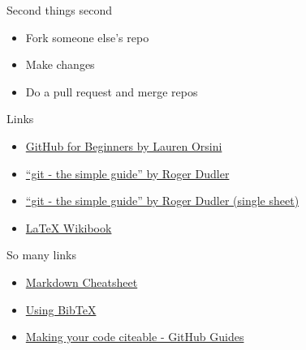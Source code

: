 \begin{frame}{Second things second}

\begin{itemize}
\itemsep1pt\parskip0pt
\item
  Fork someone else's repo
\item
  Make changes
\item
  Do a pull request and merge repos
\end{itemize}

\end{frame}

\begin{frame}{Links}

\begin{itemize}
\itemsep1pt\parskip0pt
\item
  \href{http://readwrite.com/2013/09/30/understanding-github-a-journey-for-beginners-part-1\#awesm=~oElSkDwiv4MYYT}{GitHub
  for Beginners by Lauren Orsini}
\item
  \href{http://rogerdudler.github.io/git-guide/}{``git - the simple
  guide'' by Roger Dudler}
\item
  \href{http://rogerdudler.github.io/git-guide/files/git_cheat_sheet.pdf}{``git
  - the simple guide'' by Roger Dudler (single sheet)}
\item
  \href{http://en.wikibooks.org/wiki/LaTeX}{LaTeX Wikibook}
\end{itemize}

\end{frame}

\begin{frame}{So many links}

\begin{itemize}
\itemsep1pt\parskip0pt
\item
  \href{https://github.com/adam-p/markdown-here/wiki/Markdown-Cheatsheet}{Markdown
  Cheatsheet}
\item
  \href{http://www.bibtex.org/Using/}{Using BibTeX}
\item
  \href{https://guides.github.com/activities/citable-code/}{Making your
  code citeable - GitHub Guides}
\end{itemize}

\end{frame}
